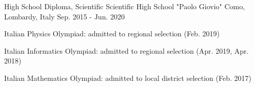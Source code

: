 \begin{cventries}

  \cventry
  {High School Diploma, Scientific} %
  {Scientific High School "Paolo Giovio"} %
  {Como, Lombardy, Italy} %
  {Sep. 2015 - Jun. 2020} %
  {
    \begin{cvitems} %
      \item {Italian Physics Olympiad: admitted to regional selection (Feb. 2019)}
      \item {Italian Informatics Olympiad: admitted to regional selection (Apr. 2019, Apr. 2018)}
      \item {Italian Mathematics Olympiad: admitted to local district selection (Feb. 2017)}
    \end{cvitems}
  }

\end{cventries}
